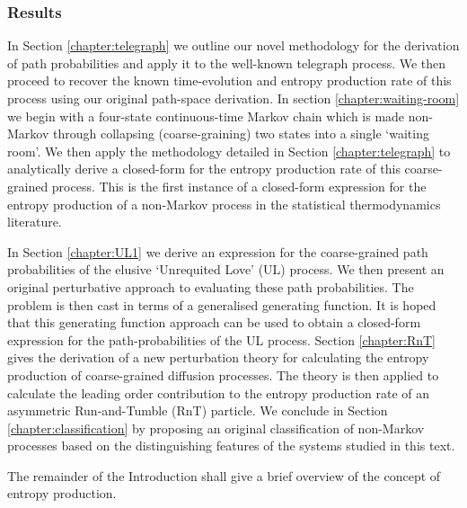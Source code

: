 \subsubsection{Results}
In Section \ref{chapter:telegraph} we outline our novel methodology for the derivation of path probabilities and apply it to the well-known telegraph process. We then proceed to recover the known time-evolution and entropy production rate of this process using our original path-space derivation. In section \ref{chapter:waiting-room} we begin with a four-state continuous-time Markov chain which is made non-Markov through collapsing (coarse-graining) two states into a single `waiting room'. We then apply the methodology detailed in Section \ref{chapter:telegraph} to analytically derive a closed-form for the entropy production rate of this coarse-grained process. This is the first instance of a closed-form expression for the entropy production of a non-Markov process in the statistical thermodynamics literature. 

In Section \ref{chapter:UL1} we derive an expression for the coarse-grained path probabilities of the elusive `Unrequited Love' (UL) process. We then present an original perturbative approach to evaluating these path probabilities. The problem is then cast in terms of a generalised generating function. It is hoped that this generating function approach can be used to obtain a closed-form expression for the path-probabilities of the UL process. Section \ref{chapter:RnT} gives the derivation of a new perturbation theory for calculating the entropy production of coarse-grained diffusion processes. The theory is then applied to calculate the leading order contribution to the entropy production rate of an asymmetric Run-and-Tumble (RnT) particle. We conclude in Section \ref{chapter:classification} by proposing an original classification of non-Markov processes based on the distinguishing features of the systems studied in this text. 

The remainder of the Introduction shall give a brief overview of the concept of entropy production. 

